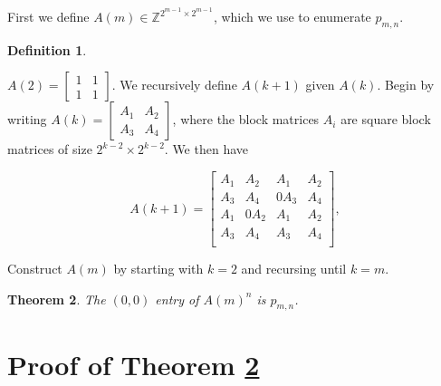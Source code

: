 \documentclass[12pt]{article}
\theoremstyle{plain}
\newtheorem{thm}{Theorem}
\theoremstyle{definition}
\newtheorem{defn}[thm]{Definition}
\theoremstyle{remark}
\theoremstyle{definition}
\begin{document}
First we define $A(m) \in \mathbb{Z}^{2^{m-1} \times 2^{m-1}}$, which we use to enumerate $p_{m,n}$.

\begin{defn}
\label{defn: A}

$A(2) = \begin{bmatrix}
1 & 1 \\
1 & 1
\end{bmatrix}
$. We recursively define $A(k+1)$ given $A(k)$. Begin by writing
$
A(k) = \begin{bmatrix}
A_1 & A_2 \\
A_3 & A_4
\end{bmatrix}
$, where the block matrices $A_i$ are square block matrices of size $2^{k-2} \times 2^{k-2}$. We then have

$$
A(k+1) = \begin{bmatrix}
A_1 & A_2 & A_1 & A_2 \\
A_3 & A_4 & 0A_3 & A_4 \\
A_1 & 0A_2 & A_1 & A_2 \\
A_3 & A_4 & A_3 & A_4 \\
\end{bmatrix},
$$

Construct $A(m)$ by starting with $k=2$ and recursing until $k=m$. 

\end{defn}

\begin{thm}
\label{thm: main theorem}    
The $(0,0)$ entry of $A(m)^n$ is $p_{m,n}$.
\end{thm}

\section{Proof of Theorem \ref{thm: main theorem}}
\end{document}
